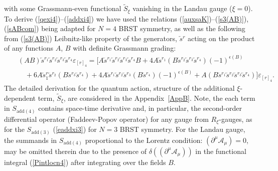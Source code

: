 \documentclass[10pt]{article}
\begin{document}
with some Grassmann-even functional  $\widetilde{S}_\xi$ vanishing in the Landau gauge ($\xi=0$).  To derive (\ref{qexi4})--(\ref{addxi4})  we have used the relations (\ref{auxsaK})--(\ref{s3(AB)}), (\ref{sABcom}) being adapted for $N=4$ BRST symmetry, as well as the following from (\ref{s3(AB)})
 Leibnitz-like property of the generators, $\overleftarrow{s}{}^{r}$ acting on the product of
any functions $A$, $B$ with definite Grassmann grading:
\begin{eqnarray}\label{s4(AB)}
&& \left(  AB\right) \overleftarrow{s}{}^{r_1}\overleftarrow{s}{}^{r_2}\overleftarrow{s}{}^{r_3}\overleftarrow{s}{}^{r_4}\varepsilon_{[r]_4}
=  \Big[ A \overleftarrow{s}{}^{r_1}\overleftarrow{s}{}^{r_2}\overleftarrow{s}{}^{r_3}\overleftarrow{s}{}^{r_4} B+4A\overleftarrow{s}{}^{r_1}
\left(  B\overleftarrow{s}{}^{r_2}\overleftarrow{s}{}^{r_3}\overleftarrow{s}{}^{r_4}\right)  \left(  -1\right) ^{\epsilon(B)} \\
&& \quad +6A\overleftarrow{s}{}^{r}_1\overleftarrow{s}{}^{r_2}
\left(  B\overleftarrow{s}{}^{r_3}\overleftarrow{s}{}^{r_4}\right)+ 4A\overleftarrow{s}{}^{r_1}\overleftarrow{s}{}^{r_2}\overleftarrow{s}{}^{r_3}
\left(  B\overleftarrow{s}{}^{r_4}\right)  \left(  -1\right) ^{\epsilon(B)} +A\left(
B\overleftarrow{s}{}^{r_1}\overleftarrow{s}{}^{r_2}\overleftarrow{s}{}^{r_3}\overleftarrow{s}{}^{r_4}\right)\Big]\varepsilon_{[r]_4} .  \nonumber %
\end{eqnarray}
The detailed derivation for the quantum action, structure of the additional $\xi$-dependent term,  $\widetilde{S}_\xi$, are considered in the   Appendix~\ref{AppB}.
Note, the each term in $S_{\mathrm{add}(4)}$ contains space-time derivative and, in particular, the second-order differential operator (Faddeev-Popov operator)  for any gauge from $R_\xi$-gauges, as for the   $S_{\mathrm{add}(3)}$ (\ref{eaddxi3}) for $N=3$ BRST symmetry. For the Landau gauge, the summands in $S_{\mathrm{add}(4)}$ proportional to the Lorentz condition: $(\partial^\mu\mathcal{ A}_{\mu })=0$, may be omitted therein due to the presence of $\delta((\partial^\mu\mathcal{ A}_{\mu }))$ in the functional integral (\ref{Pintlocn4}) after integrating over the fields $B$.
\end{document}
